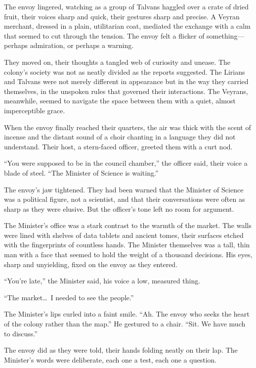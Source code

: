 \documentclass{article}
\theoremstyle{plain}
\theoremstyle{definition}
\theoremstyle{remark}
\begin{document}
\begin{tcolorbox}[colback=red!3, colframe=red!40!black, title=\textbf{Qwen3-4B (Base)}, fonttitle=\bfseries, left=2mm, right=2mm, breakable]
The envoy lingered, watching as a group of Talvans haggled over a crate of dried fruit, their voices sharp and quick, their gestures sharp and precise. A Veyran merchant, dressed in a plain, utilitarian coat, mediated the exchange with a calm that seemed to cut through the tension. The envoy felt a flicker of something---perhaps admiration, or perhaps a warning.  

They moved on, their thoughts a tangled web of curiosity and unease. The colony’s society was not as neatly divided as the reports suggested. The Lirians and Talvans were not merely different in appearance but in the way they carried themselves, in the unspoken rules that governed their interactions. The Veyrans, meanwhile, seemed to navigate the space between them with a quiet, almost imperceptible grace.  

When the envoy finally reached their quarters, the air was thick with the scent of incense and the distant sound of a choir chanting in a language they did not understand. Their host, a stern-faced officer, greeted them with a curt nod.  

``You were supposed to be in the council chamber,'' the officer said, their voice a blade of steel. ``The Minister of Science is waiting.''  

The envoy’s jaw tightened. They had been warned that the Minister of Science was a political figure, not a scientist, and that their conversations were often as sharp as they were elusive. But the officer’s tone left no room for argument.  

The Minister’s office was a stark contrast to the warmth of the market. The walls were lined with shelves of data tablets and ancient tomes, their surfaces etched with the fingerprints of countless hands. The Minister themselves was a tall, thin man with a face that seemed to hold the weight of a thousand decisions. His eyes, sharp and unyielding, fixed on the envoy as they entered.  

``You’re late,'' the Minister said, his voice a low, measured thing.  

``The market\dots\ I needed to see the people.''  

The Minister’s lips curled into a faint smile. ``Ah. The envoy who seeks the heart of the colony rather than the map.'' He gestured to a chair. ``Sit. We have much to discuss.''  

The envoy did as they were told, their hands folding neatly on their lap. The Minister’s words were deliberate, each one a test, each one a question.  


\end{tcolorbox}
\end{document}
